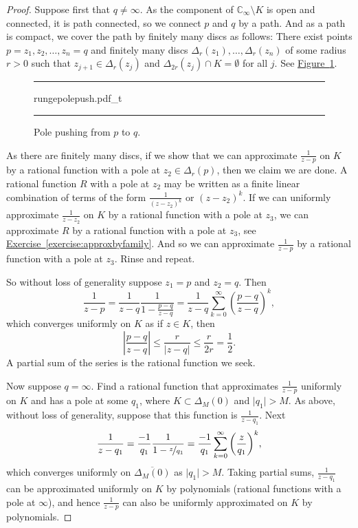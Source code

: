\documentclass[12pt,openany]{book}
\newcommand{\sabs}[1]{\lvert {#1} \rvert}
\newcommand{\abs}[1]{\left\lvert {#1} \right\rvert}
\newcommand{\C}{{\mathbb{C}}}
\theoremstyle{plain}
\theoremstyle{remark}
\theoremstyle{definition}
\newenvironment{myfig}{%
\begin{figure}[h!t]
\noindent\rule{\textwidth}{0.5pt}\vspace{12pt}\par\centering}%
{\par\noindent\rule{\textwidth}{0.5pt}
\end{figure}}
\theoremstyle{exercise}
\theoremstyle{example}
\newcommand{\figureref}[1]{\hyperref[#1]{Figure~\ref*{#1}}}
\newcommand{\exerciseref}[1]{\hyperref[#1]{Exercise~\ref*{#1}}}
\begin{document}
\begin{proof}
Suppose first that $q \not= \infty$.
As the component of $\C_\infty \setminus K$ is open and connected, it is
path connected,
so we connect $p$ and $q$ by a path.
And as a path is compact,
we cover the path by finitely many discs as follows: 
There exist points $p=z_1,z_2,\ldots,z_n=q$ and
finitely many discs $\Delta_{r}(z_1),\ldots,\Delta_{r}(z_n)$
of some radius $r > 0$
such that $z_{j+1} \in \Delta_{r}(z_j)$
and $\Delta_{2r}(z_j) \cap K = \emptyset$ for all $j$.
See \figureref{fig:rungepolepush}.

\begin{myfig}
{rungepolepush.pdf_t}
\caption{Pole pushing from $p$ to $q$.\label{fig:rungepolepush}}
\end{myfig}

As there are finitely many discs, if we show that we can approximate
$\frac{1}{z-p}$ on $K$ by a rational function with a pole at $z_2 \in
\Delta_r(p)$, then we claim we are done.  A rational function $R$ with a pole
at $z_2$ may be written as
a finite linear combination of terms of the form $\frac{1}{{(z-z_2)}^k}$
or $(z-z_2)^k$.  If we can uniformly approximate $\frac{1}{z-z_2}$ on $K$ by a rational
function with a pole at $z_3$, we can approximate $R$ by a rational function
with a pole at $z_3$, see \exerciseref{exercise:approxbyfamily}.
And so we can approximate $\frac{1}{z-p}$ by a rational function with a pole at $z_3$.
Rinse and repeat.

So without loss of generality suppose $z_1=p$ and $z_2=q$.
Then
\begin{equation*}
\frac{1}{z-p}
=
\frac{1}{z-q}
\frac{1}{1-\frac{p-q}{z-q}}
=
\frac{1}{z-q}
\sum_{k=0}^\infty
{\left(\frac{p-q}{z-q}\right)}^k ,
\end{equation*}
which converges uniformly on $K$ as if $z \in K$, then
\begin{equation*}
\abs{\frac{p-q}{z-q}}
\leq 
\frac{r}{\sabs{z-q}}
\leq
\frac{r}{2r} = \frac{1}{2} .
\end{equation*}
A partial sum of the series is the rational function we seek.

Now suppose $q =\infty$. Find a rational function
that approximates $\frac{1}{z-p}$ uniformly on $K$ and has a pole
at some $q_1$, where
$K \subset \Delta_M(0)$ and $\sabs{q_1} > M$.
As above, without loss of generality, suppose that this function
is $\frac{1}{z-q_1}$.
Next
\begin{equation*}
\frac{1}{z-q_1}
=
\frac{-1}{q_1}
\frac{1}{1-\nicefrac{z}{q_1}}
=
\frac{-1}{q_1}
\sum_{k=0}^\infty
{\left(\frac{z}{q_1}\right)}^k ,
\end{equation*}
which converges uniformly on $\overline{\Delta_M(0)}$ as  $\sabs{q_1} > M$.
Taking partial sums, $\frac{1}{z-q_1}$ can be approximated
uniformly on $K$ by polynomials (rational functions with a pole at
$\infty$),
and hence $\frac{1}{z-p}$ can also be uniformly approximated on $K$ by polynomials.
\end{proof}
\end{document}
